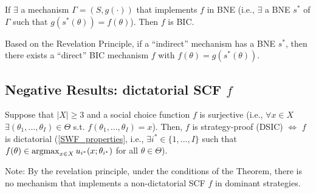 \documentclass[11pt]{elegantbook}
\newcommand{\argmax}{\operatornamewithlimits{argmax}}
\begin{document}
\begin{theorem}\label{theorem:revelation principle BIC}
    If $\exists$ a mechanism $\Gamma=(S,g(\cdot))$ that implements $f$ in BNE (i.e., $\exists$ a BNE $s^*$ of $\Gamma$ such that $g(s^*(\theta))=f(\theta)$). Then $f$ is BIC.
    \begin{note}
        Based on the Revelation Principle, if a ``indirect'' mechanism has a BNE $s^*$, then there exists a ``direct'' BIC mechanism $f$ with $f(\theta)=g(s^*(\theta))$.
    \end{note}
\end{theorem}


\subsection{Negative Results: dictatorial SCF $f$}
\begin{theorem}
    Suppose that $|X|\geq 3$ and a social choice function $f$ is surjective (i.e., $\forall x\in X$ $\exists (\theta_1,...,\theta_I)\in\Theta$ s.t. $f(\theta_1,...,\theta_I)=x$). Then, $f$ is strategy-proof (DSIC) $\Leftrightarrow$ $f$ is dictatorial (\ref{SWF_properties}, i.e., $\exists i^*\in\{1,...,I\}$ such that $f(\theta)\in \argmax_{x\in X}u_{i^*}(x;\theta_{i^*})$ for all $\theta\in \Theta$).
\end{theorem}
Note: By the revelation principle, under the conditions of the Theorem, there is no mechanism that implements a non-dictatorial SCF $f$ in dominant strategies.

\end{document}

